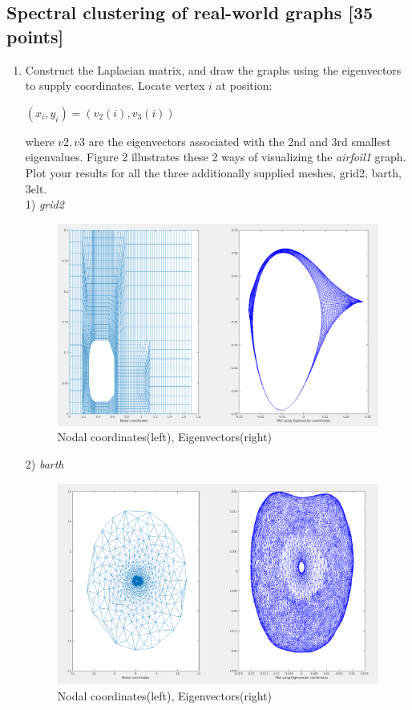 \documentclass[unicode,11pt,a4paper,oneside,numbers=endperiod,openany]{scrartcl}
\begin{document}
\subsection{Spectral clustering of real-world graphs [35 points]}
\begin{enumerate}
 \item Construct the Laplacian matrix, and draw the graphs using the eigenvectors to supply coordinates. Locate vertex
${i}$ at position: \\

 \begin{center}
  \begin{math}
 (x_i, y_i) = (v_2(i), v_3(i))
\end{math}
 \end{center}

where ${v2, v3}$ are the eigenvectors associated with the 2nd and 3rd smallest eigenvalues. Figure 2 illustrates
these 2 ways of visualizing the \textit{airfoil1} graph. Plot your results for all the three additionally supplied meshes,
grid2, barth, 3elt. \\

1) \textit{grid2}
\begin{figure}[h!]
    \begin{minipage}[c]{1\linewidth}
        \centering
        \includegraphics[width=0.6\linewidth]{./figures/grid2.png}
    \end{minipage}
  \caption{Nodal coordinates(left), Eigenvectors(right)}
\end{figure}


2) \textit{barth}
\begin{figure}[h!]
    \begin{minipage}[c]{1\linewidth}
        \centering
        \includegraphics[width=0.6\linewidth]{./figures/barth.png}
    \end{minipage}
  \caption{Nodal coordinates(left), Eigenvectors(right)}
\end{figure}


\end{enumerate}
\end{document}
